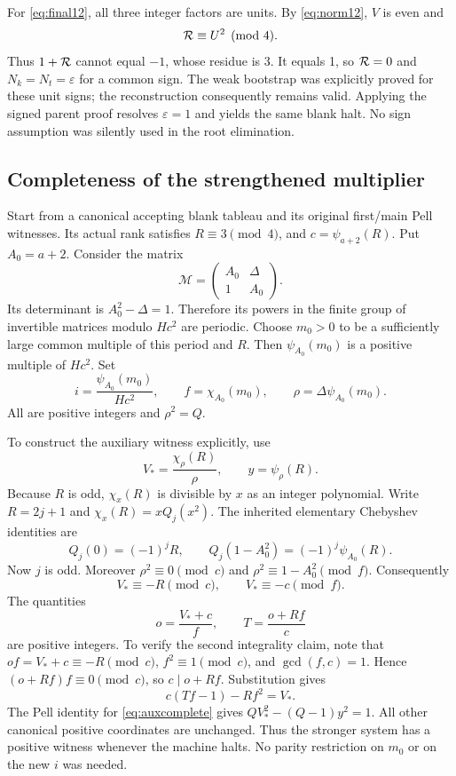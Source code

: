 For \eqref{eq:final12}, all three integer factors are units. By
\eqref{eq:norm12}, $V$ is even and
\[
 \mathcal R\equiv U^2\pmod4.
\]
Thus $1+\mathcal R$ cannot equal $-1$, whose residue is 3. It equals 1, so
$\mathcal R=0$ and $N_k=N_t=\varepsilon$ for a common sign. The weak bootstrap
was explicitly proved for these unit signs; the reconstruction consequently
remains valid. Applying the signed parent proof resolves
$\varepsilon=1$ and yields the same blank halt. No sign assumption was
silently used in the root elimination.

\subsection{Completeness of the strengthened multiplier}\label{sec:complete12}

Start from a canonical accepting blank tableau and its original first/main
Pell witnesses. Its actual rank satisfies $R\equiv3\pmod4$, and
$c=\psi_{a+2}(R)$. Put $A_0=a+2$. Consider the matrix
\[
 \mathcal M=\begin{pmatrix}A_0&\Delta\\1&A_0\end{pmatrix}.
\]
Its determinant is $A_0^2-\Delta=1$. Therefore its powers in the finite
group of invertible matrices modulo $Hc^2$ are periodic. Choose $m_0>0$
to be a sufficiently large common multiple of this period and $R$.
Then $\psi_{A_0}(m_0)$ is a positive multiple of $Hc^2$. Set
\begin{equation}
 i=\frac{\psi_{A_0}(m_0)}{Hc^2},\qquad
 f=\chi_{A_0}(m_0),\qquad
 \rho=\Delta\psi_{A_0}(m_0).\label{eq:periodic}
\end{equation}
All are positive integers and $\rho^2=Q$.

To construct the auxiliary witness explicitly, use
\begin{equation}
 V_* =\frac{\chi_\rho(R)}{\rho},\qquad y=\psi_\rho(R).
 \label{eq:auxcomplete}
\end{equation}
Because $R$ is odd, $\chi_x(R)$ is divisible by $x$ as an integer polynomial.
Write $R=2j+1$ and $\chi_x(R)=xQ_j(x^2)$. The inherited elementary
Chebyshev identities are
\[
 Q_j(0)=(-1)^jR,\qquad
 Q_j(1-A_0^2)=(-1)^j\psi_{A_0}(R).
\]
Now $j$ is odd. Moreover $\rho^2\equiv0\pmod c$ and
$\rho^2\equiv1-A_0^2\pmod f$. Consequently
\begin{equation}
 V_*\equiv-R\pmod c,\qquad V_*\equiv-c\pmod f.\label{eq:quotients}
\end{equation}
The quantities
\[
 o=\frac{V_*+c}{f},\qquad T=\frac{o+Rf}{c}
\]
are positive integers. To verify the second integrality claim, note that
$of=V_*+c\equiv-R\pmod c$, $f^2\equiv1\pmod c$, and $\gcd(f,c)=1$.
Hence $(o+Rf)f\equiv0\pmod c$, so $c\mid o+Rf$.
Substitution gives
\[
 c(Tf-1)-Rf^2=V_*.
\]
The Pell identity for \eqref{eq:auxcomplete} gives
$Q V_*^2-(Q-1)y^2=1$. All other canonical positive coordinates are
unchanged. Thus the stronger system has a positive witness whenever the
machine halts. No parity restriction on $m_0$ or on the new $i$ was needed.

